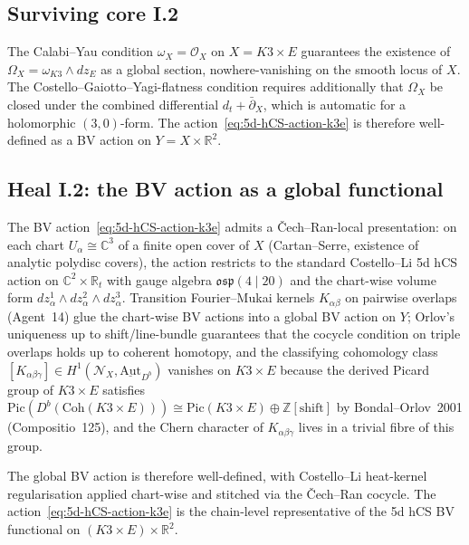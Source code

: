 \subsection*{Surviving core I.2}

The Calabi--Yau condition $\omega_X = \mathcal{O}_X$ on $X = K3 \times E$
guarantees the existence of $\Omega_X = \omega_{K3} \wedge dz_E$ as a
global section, nowhere-vanishing on the smooth locus of $X$. The
Costello--Gaiotto--Yagi-flatness condition requires additionally that
$\Omega_X$ be closed under the combined differential $d_t +
\bar\partial_X$, which is automatic for a holomorphic $(3,0)$-form.
The action~\eqref{eq:5d-hCS-action-k3e} is therefore well-defined as a
BV action on $Y = X \times \mathbb{R}^2$.

\subsection*{Heal I.2: the BV action as a global functional}

The BV action~\eqref{eq:5d-hCS-action-k3e} admits a Čech--Ran-local
presentation: on each chart $U_\alpha \cong \mathbb{C}^3$ of a finite
open cover of $X$ (Cartan--Serre, existence of analytic polydisc
covers), the action restricts to the standard Costello--Li 5d hCS
action on $\mathbb{C}^2 \times \mathbb{R}_t$ with gauge algebra
$\mathfrak{osp}(4 \mid 20)$ and the chart-wise volume form
$dz_\alpha^1 \wedge dz_\alpha^2 \wedge dz_\alpha^3$. Transition
Fourier--Mukai kernels $K_{\alpha\beta}$ on pairwise overlaps (Agent~14)
glue the chart-wise BV actions into a global BV action on $Y$;
Orlov's uniqueness up to shift/line-bundle guarantees that the cocycle
condition on triple overlaps holds up to coherent homotopy, and the
classifying cohomology class
$[K_{\alpha\beta\gamma}] \in H^1(\mathcal{N}_X,
\underline{\mathrm{Aut}}_{D^b})$ vanishes on $K3 \times E$ because
the derived Picard group of $K3 \times E$ satisfies
$\mathrm{Pic}(D^b(\mathrm{Coh}(K3 \times E))) \cong
\mathrm{Pic}(K3 \times E) \oplus \mathbb{Z}[\text{shift}]$ by
Bondal--Orlov~2001 (Compositio~125), and the Chern character of
$K_{\alpha\beta\gamma}$ lives in a trivial fibre of this group.

The global BV action is therefore well-defined, with Costello--Li
heat-kernel regularisation applied chart-wise and stitched via the
Čech--Ran cocycle. The action~\eqref{eq:5d-hCS-action-k3e} is the
chain-level representative of the 5d hCS BV functional on
$(K3 \times E) \times \mathbb{R}^2$.

